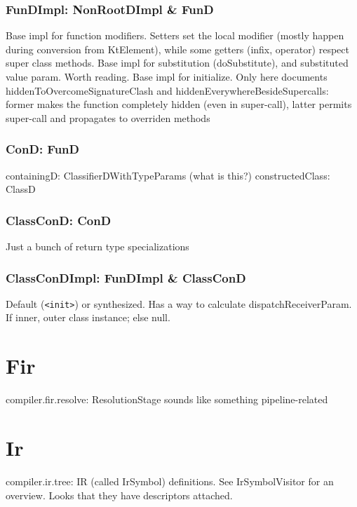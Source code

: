 \documentclass{article}
\begin{document}
\subsubsection{FunDImpl: NonRootDImpl \& FunD}

Base impl for function modifiers. Setters set the local modifier (mostly happen during conversion from KtElement), while some getters (infix, operator) respect super class methods.
Base impl for substitution (doSubstitute), and substituted value param. Worth reading.
Base impl for initialize.
Only here documents hiddenToOvercomeSignatureClash and hiddenEverywhereBesideSupercalls: former makes the function completely hidden (even in super-call), latter permits super-call and propagates to overriden methods

\subsubsection{ConD: FunD}

containingD: ClassifierDWithTypeParams (what is this?)
constructedClass: ClassD

\subsubsection{ClassConD: ConD}

Just a bunch of return type specializations

\subsubsection{ClassConDImpl: FunDImpl \& ClassConD}

Default (\texttt{<init>}) or synthesized.
Has a way to calculate dispatchReceiverParam. If inner, outer class instance; else null.


\section{Fir}

compiler.fir.resolve: ResolutionStage sounds like something pipeline-related

\section{Ir}

compiler.ir.tree: IR (called IrSymbol) definitions. See IrSymbolVisitor for an overview. Looks that they have descriptors attached.
\end{document}
